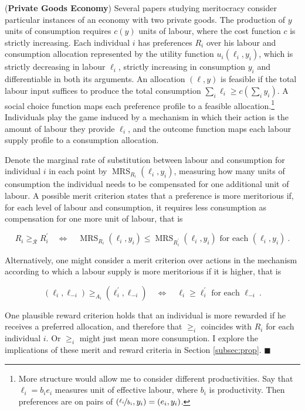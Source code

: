 \begin{example} \label{ex:priv}
	 (\textbf{Private Goods Economy}) Several papers studying meritocracy \citep{andreShallowMeritocracy2024,cappelenMeritocraticOriginEgalitarian2022,cappelenMeritPrimacyEffect2023,cappelenFairnessLimitedInformation2024,fleurbaeyFairnessResponsibilityWelfare2008} consider particular instances of an economy with two private goods. The production of \( y \) units of consumption requires \( c ( y ) \) units of labour, where the cost function \( c \) is strictly increasing. Each individual \( i \) has preferences \( R_i \) over his labour and consumption allocation represented by the utility function \( u_i ( \ell_i, y_i ) \), which is strictly decreasing in labour \( \ell_i \), strictly increasing in consumption \( y_i \) and differentiable in both its arguments. An allocation  \( ( \ell, y ) \) is feasible if the total labour input suffices to produce the total consumption \( \sum_{i} \ell_i \geq c ( \sum_i y_i ) \). A social choice function maps each preference profile to a feasible allocation.\footnote{More structure would allow me to consider different productivities. Say that \( \ell_i = b_i e_i \) measures unit of effective labour, where \( b_i \) is productivity. Then preferences are on pairs of \( ( \nicefrac{\ell_i}{b_i}, y_i ) = ( e_i, y_i ) \).} Individuals play the game induced by a mechanism in which their action is the amount of labour they provide \( \ell_i \), and the outcome function maps each labour supply profile to a consumption allocation.

	Denote the marginal rate of substitution between labour and consumption for individual \( i \) in each point by \( \operatorname{MRS}_{R_i} ( \ell_i, y_i ) \), measuring how many units of consumption the individual needs to be compensated for one additional unit of labour. A possible merit criterion states that a preference is more meritorious if, for each level of labour and consumption, it requires less consumption as compensation for one more unit of labour, that is

	\[ R_i \geq_{\mathcal{R}} R_i^{\prime} \quad \Longleftrightarrow \quad \operatorname{MRS}_{R_i} ( \ell_i, y_i ) \leq \operatorname{MRS}_{R^{\prime}_i} ( \ell_i, y_i ) \text{ for each } ( \ell_i, y_i ) \: .\]

	Alternatively, one might consider a merit criterion over actions in the mechanism according to which a labour supply is more meritorious if it is higher, that is

	\[ ( \ell_i, \ell_{-i} ) \geq_{A_i} ( \ell^{\prime}_i, \ell_{-i} ) \quad \Longleftrightarrow \quad  \ell_i \geq \ell^{\prime}_i \text{ for each } \ell_{-i} \: .\]

	One plausible reward criterion holds that an individual is more rewarded if he receives a preferred allocation, and therefore that \( \geq_i \) coincides with \( R_i \) for each individual \( i \). Or \( \geq_i \) might just mean more consumption. I explore the implications of these merit and reward criteria in Section \ref{subsec:prop}. \hfill \( \blacksquare \)
\end{example}

